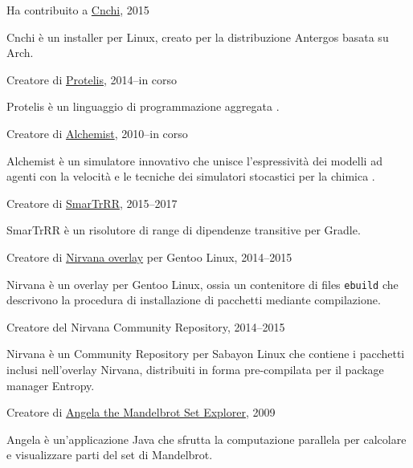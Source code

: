 \documentclass[10pt]{article}
\newenvironment{innerlist}[1][\enskip\textbullet]%
        {\begin{compactitem}[#1]}{\end{compactitem}}
\newcommand{\halfblankline}{\quad\vspace{-0.5\baselineskip}\pagebreak[3]}
\begin{document}
Ha contribuito a \href{https://github.com/Antergos/Cnchi}{Cnchi}, 2015
\begin{innerlist}
    \item Cnchi è un installer per Linux, creato per la distribuzione Antergos basata su Arch.
\end{innerlist}
\halfblankline

Creatore di \href{http://protelis.org/}{Protelis}, 2014--in corso
\begin{innerlist}
    \item Protelis è un linguaggio di programmazione aggregata \cite{PianiniSAC2015}.
\end{innerlist}
\halfblankline

Creatore di \href{http://alchemist.apice.unibo.it/}{Alchemist}, 2010--in corso
\begin{innerlist}
    \item Alchemist è un simulatore innovativo che unisce l'espressività dei modelli ad agenti con la velocità e le tecniche dei simulatori stocastici per la chimica \cite{PianiniJOS2013}.
\end{innerlist}
\halfblankline

Creatore di \href{https://github.com/DanySK/SmarTrRR}{SmarTrRR}, 2015--2017
\begin{innerlist}
    \item SmarTrRR è un risolutore di range di dipendenze transitive per Gradle.
\end{innerlist}
\halfblankline

Creatore di \href{https://bitbucket.org/danysk/nirvana-overlay/}{Nirvana overlay} per Gentoo Linux, 2014--2015
\begin{innerlist}
    \item Nirvana è un overlay per Gentoo Linux, ossia un contenitore di files \texttt{ebuild} che descrivono la procedura di installazione di pacchetti mediante compilazione.
\end{innerlist}
\halfblankline

Creatore del {Nirvana Community Repository}, 2014--2015
\begin{innerlist}
    \item Nirvana è un Community Repository per Sabayon Linux che contiene i pacchetti inclusi nell'overlay Nirvana, distribuiti in forma pre-compilata per il package manager Entropy.
\end{innerlist}
\halfblankline

Creatore di \href{https://sourceforge.net/projects/mandelbrot/}{Angela the Mandelbrot Set Explorer}, 2009
\begin{innerlist}
  \item Angela è un'applicazione Java che sfrutta la computazione parallela per calcolare e visualizzare parti del set di Mandelbrot.
\end{innerlist}
\halfblankline
\end{document}
